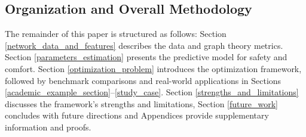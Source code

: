 \documentclass[lettersize,journal]{IEEEtran}
\begin{document}
\subsection{Organization and Overall Methodology}
The remainder of this paper is structured as follows: Section \ref{network_data_and_features} describes the data and graph theory metrics. Section \ref{parameters_estimation} presents the predictive model for safety and comfort. Section \ref{optimization_problem} introduces the optimization framework, followed by benchmark comparisons and real-world applications in Sections \ref{academic_example_section}–\ref{study_case}. Section \ref{strengths_and_limitations} discusses the framework’s strengths and limitations, Section \ref{future_work} concludes with future directions and Appendices provide supplementary information and proofs.
\end{document}
